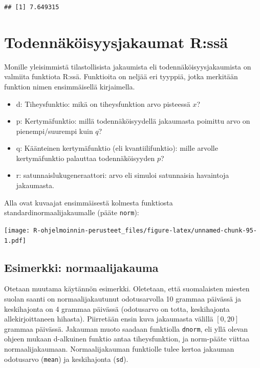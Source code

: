 \documentclass[
]{book}
\providecommand{\tightlist}{%
  \setlength{\itemsep}{0pt}\setlength{\parskip}{0pt}}
\begin{document}
\begin{verbatim}
## [1] 7.649315
\end{verbatim}

\hypertarget{distributions}{%
\chapter{Todennäköisyysjakaumat R:ssä}\label{distributions}}

Monille yleisimmistä tilastollisista jakaumista eli todennäköisyysjakaumista on valmiita funktiota R:ssä. Funktioita on neljää eri tyyppiä, jotka merkitään funktion nimen ensimmäisellä kirjaimella.

\begin{itemize}
\tightlist
\item
  d: Tiheysfunktio: mikä on tiheysfunktion arvo pisteessä \(x\)?
\item
  p: Kertymäfunktio: millä todennäköisyydellä jakaumasta poimittu arvo on pienempi/suurempi kuin \(q\)?
\item
  q: Käänteinen kertymäfunktio (eli kvantiilifunktio): mille arvolle kertymäfunktio palauttaa todennäköisyyden \(p\)?
\item
  r: satunnaislukugeneraattori: arvo eli simuloi satunnaisia havaintoja jakaumasta.
\end{itemize}

Alla ovat kuvaajat ensimmäisestä kolmesta funktiosta standardinormaalijakaumalle (pääte \texttt{norm}):

\texttt{[image: R-ohjelmoinnin-perusteet\_files/figure-latex/unnamed-chunk-95-1.pdf]}

\hypertarget{esimerkki-normaalijakauma}{%
\section{Esimerkki: normaalijakauma}\label{esimerkki-normaalijakauma}}

Otetaan muutama käytännön esimerkki. Oletetaan, että suomalaisten miesten suolan saanti on normaalijakautunut odotusarvolla 10 grammaa päivässä ja keskihajonta on 4 grammaa päivässä (odotusarvo on totta, keskihajonta allekirjoittaneen hihasta). Piirretään ensin kuva jakaumasta välillä \([0, 20]\) grammaa päivässä. Jakauman muoto saadaan funktiolla \texttt{dnorm}, eli yllä olevan ohjeen mukaan d-alkuinen funktio antaa tiheysfunktion, ja norm-pääte viittaa normaalijakaumaan. Normaalijakauman funktiolle tulee kertoa jakauman odotusarvo (\texttt{mean}) ja keskihajonta (\texttt{sd}).
\end{document}
